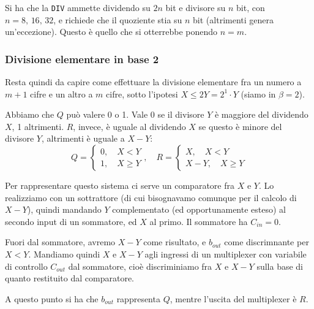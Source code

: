 \documentclass[a4paper,11pt]{article}
\begin{document}
Si ha che la \lstinline|DIV| ammette dividendo su $2n$ bit e divisore su $n$ bit, con $n = 8, \, 16, \, 32$, e richiede che il quoziente stia su $n$ bit (altrimenti genera un'eccezione).
Questo è quello che si otterrebbe ponendo $n = m$.

\subsubsection{Divisione elementare in base 2}
Resta quindi da capire come effettuare la divisione elementare fra un numero a $m+1$ cifre e un altro a $m$ cifre, sotto l'ipotesi $X \leq 2Y = 2^1 \cdot Y$ (siamo in $\beta=2$).

Abbiamo che $Q$ può valere 0 o 1. Vale 0 se il divisore $Y$ è maggiore del dividendo $X$, 1 altrimenti.
$R$, invece, è uguale al dividendo $X$ se questo è minore del divisore $Y$, altrimenti è uguale a $X - Y$:
$$
Q=
\begin{cases}
	0, \quad X < Y \\ 
	1, \quad X \geq Y
\end{cases}, \quad 
R =
\begin{cases}
	X, \quad X < Y \\ 
	X-Y, \quad X \geq Y
\end{cases}
$$

Per rappresentare questo sistema ci serve un comparatore fra $X$ e $Y$. 
Lo realizziamo con un sottrattore (di cui bisognavamo comunque per il calcolo di $X-Y$), quindi mandando $Y$ complementato (ed opportunamente esteso) al secondo input di un sommatore, ed $X$ al primo. 
Il sommatore ha $C_{in} = 0$.

Fuori dal sommatore, avremo $X-Y$ come risultato, e $b_{out}$ come discrimnante per $X < Y$.
Mandiamo quindi $X$ e $X-Y$ agli ingressi di un multiplexer con variabile di controllo $C_{out}$ dal sommatore,
cioè discriminiamo fra $X$ e $X-Y$ sulla base di quanto restituito dal comparatore.

A questo punto si ha che $b_{out}$ rappresenta $Q$, mentre l'uscita del multiplexer è $R$.
\end{document}
